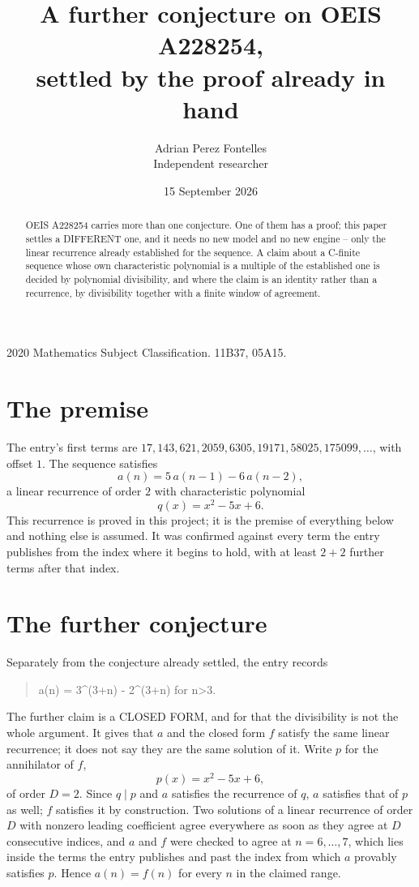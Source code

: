 \documentclass[11pt,a4paper]{article}
\title{A further conjecture on OEIS A228254,\\ \large settled by the proof already in hand}
\author{Adrian Perez Fontelles\\ \small Independent researcher}
\date{15 September 2026}
\theoremstyle{plain}
\theoremstyle{definition}
\begin{document}
\maketitle

\begin{abstract}
OEIS A228254 carries more than one conjecture. One of them has a proof; this paper settles a
DIFFERENT one, and it needs no new model and no new engine -- only the linear recurrence already
established for the sequence. A claim about a C-finite sequence whose own characteristic
polynomial is a multiple of the established one is decided by polynomial divisibility, and where
the claim is an identity rather than a recurrence, by divisibility together with a finite window
of agreement.
\end{abstract}

\noindent\small 2020 Mathematics Subject Classification. 11B37, 05A15.\normalsize

\section{The premise}

The entry's first terms are $17, 143, 621, 2059, 6305, 19171, 58025, 175099,\dots$, with offset $1$. The sequence satisfies
\[
  a(n)=5\,a(n-1) - 6\,a(n-2) ,
\]
a linear recurrence of order $2$ with characteristic polynomial
\[
  q(x)=x^{2} - 5 x + 6 .
\]
This recurrence is proved in this project; it is the premise of everything below and nothing else is assumed.
It was confirmed against every term the entry publishes from the index where it begins to hold,
with at least $2+2$ further terms after that index.

\section{The further conjecture}

Separately from the conjecture already settled, the entry records

\begin{quote}\raggedright a(n) = 3\^{}(3+n) - 2\^{}(3+n) for n>3.\end{quote}

The further claim is a CLOSED FORM, and for that the divisibility is not the whole argument. It
gives that $a$ and the closed form $f$ satisfy the same linear recurrence; it does not say they
are the same solution of it. Write $p$ for the annihilator of $f$,
\[
  p(x)=x^{2} - 5 x + 6 ,
\]
of order $D=2$. Since $q\mid p$ and $a$ satisfies the recurrence of $q$, $a$ satisfies that of
$p$ as well; $f$ satisfies it by construction. Two solutions of a linear recurrence of order $D$
with nonzero leading coefficient agree everywhere as soon as they agree at $D$ consecutive
indices, and $a$ and $f$ were checked to agree at $n=6,\dots,7$,
which lies inside the terms the entry publishes and past the index from which $a$ provably
satisfies $p$. Hence $a(n)=f(n)$ for every $n$ in the claimed range.
\end{document}
